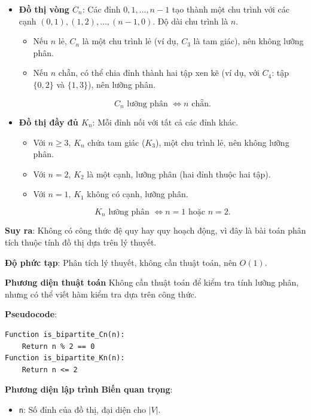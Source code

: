 \documentclass[a4paper,12pt]{article}
\begin{document}
\begin{itemize}
    \item \textbf{Đồ thị vòng \( C_n \)}: Các đỉnh \( 0, 1, \ldots, n-1 \) tạo thành một chu trình với các cạnh \( (0,1), (1,2), \ldots, (n-1,0) \). Độ dài chu trình là \( n \).
        \begin{itemize}
            \item Nếu \( n \) lẻ, \( C_n \) là một chu trình lẻ (ví dụ, \( C_3 \) là tam giác), nên không lưỡng phân.
            \item Nếu \( n \) chẵn, có thể chia đỉnh thành hai tập xen kẽ (ví dụ, với \( C_4 \): tập \( \{0,2\} \) và \( \{1,3\} \)), nên lưỡng phân.
        \end{itemize}
        \[
        C_n \text{ lưỡng phân } \iff n \text{ chẵn}.
        \]
    \item \textbf{Đồ thị đầy đủ \( K_n \)}: Mỗi đỉnh nối với tất cả các đỉnh khác.
        \begin{itemize}
            \item Với \( n \geq 3 \), \( K_n \) chứa tam giác (\( K_3 \)), một chu trình lẻ, nên không lưỡng phân.
            \item Với \( n = 2 \), \( K_2 \) là một cạnh, lưỡng phân (hai đỉnh thuộc hai tập).
            \item Với \( n = 1 \), \( K_1 \) không có cạnh, lưỡng phân.
        \end{itemize}
        \[
        K_n \text{ lưỡng phân } \iff n = 1 \text{ hoặc } n = 2.
        \]
\end{itemize}

\textbf{Suy ra}: Không có công thức đệ quy hay quy hoạch động, vì đây là bài toán phân tích thuộc tính đồ thị dựa trên lý thuyết.

\textbf{Độ phức tạp}: Phân tích lý thuyết, không cần thuật toán, nên \( O(1) \).

\textbf{Phương diện thuật toán}
Không cần thuật toán để kiểm tra tính lưỡng phân, nhưng có thể viết hàm kiểm tra dựa trên công thức.

\textbf{Pseudocode}:
\begin{verbatim}
Function is_bipartite_Cn(n):
    Return n % 2 == 0
Function is_bipartite_Kn(n):
    Return n <= 2
\end{verbatim}

\textbf{Phương diện lập trình}
\textbf{Biến quan trọng}:
\begin{itemize}
    \item \texttt{n}: Số đỉnh của đồ thị, đại diện cho \( |V| \).
\end{itemize}
\end{document}
